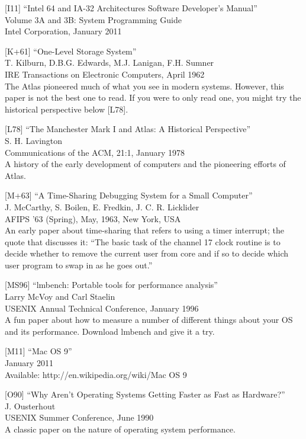 {[}I11{]} ``Intel 64 and IA-32 Architectures Software Developer's
Manual''\\
Volume 3A and 3B: System Programming Guide\\
Intel Corporation, January 2011

{[}K+61{]} ``One-Level Storage System''\\
T. Kilburn, D.B.G. Edwards, M.J. Lanigan, F.H. Sumner\\
IRE Transactions on Electronic Computers, April 1962\\
The Atlas pioneered much of what you see in modern systems. However,
this paper is not the best one to read. If you were to only read one,
you might try the historical perspective below {[}L78{]}.

{[}L78{]} ``The Manchester Mark I and Atlas: A Historical
Perspective''\\
S. H. Lavington\\
Communications of the ACM, 21:1, January 1978\\
A history of the early development of computers and the pioneering
efforts of Atlas.

{[}M+63{]} ``A Time-Sharing Debugging System for a Small Computer''\\
J. McCarthy, S. Boilen, E. Fredkin, J. C. R. Licklider\\
AFIPS '63 (Spring), May, 1963, New York, USA\\
An early paper about time-sharing that refers to using a timer
interrupt; the quote that discusses it: ``The basic task of the channel
17 clock routine is to decide whether to remove the current user from
core and if so to decide which user program to swap in as he goes out.''

{[}MS96{]} ``lmbench: Portable tools for performance analysis''\\
Larry McVoy and Carl Staelin\\
USENIX Annual Technical Conference, January 1996\\
A fun paper about how to measure a number of different things about your
OS and its performance. Download lmbench and give it a try.

{[}M11{]} ``Mac OS 9''\\
January 2011\\
Available: http://en.wikipedia.org/wiki/Mac OS 9

{[}O90{]} ``Why Aren't Operating Systems Getting Faster as Fast as
Hardware?''\\
J. Ousterhout\\
USENIX Summer Conference, June 1990\\
A classic paper on the nature of operating system performance.

